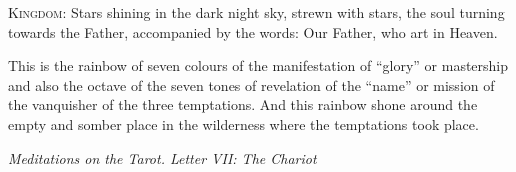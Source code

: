 \textsc{Kingdom}: Stars shining in the dark night sky, strewn with stars, the soul turning towards the Father,
accompanied by the words: Our Father, who art in Heaven.

\begin{quotationx}
This is the rainbow of seven colours of the manifestation of “glory” or mastership and also the octave of the seven
tones of revelation of the “name” or mission of the vanquisher of the three temptations. And this rainbow shone around
the empty and somber place in the wilderness where the temptations took place. 
\begin{flushright}\textit{Meditations on the Tarot. Letter VII: The Chariot}\end{flushright} 

\end{quotationx}

